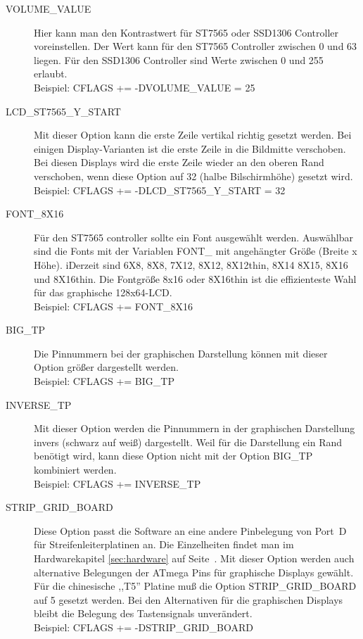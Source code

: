 \begin{description}
  \item[VOLUME\_VALUE] Hier kann man den Kontrastwert für ST7565 oder SSD1306 Controller voreinstellen.
Der Wert kann für den ST7565 Controller zwischen 0 und 63 liegen.
Für den SSD1306 Controller sind Werte zwischen 0 und 255 erlaubt.\\
Beispiel: CFLAGS += -DVOLUME\_VALUE = 25

  \item[LCD\_ST7565\_Y\_START] Mit dieser Option kann die erste Zeile vertikal richtig gesetzt werden.
Bei einigen Display-Varianten ist die erste Zeile in die Bildmitte verschoben.
Bei diesen Displays wird die erste Zeile wieder an den oberen Rand verschoben, 
wenn diese Option auf 32 (halbe Bilschirmhöhe) gesetzt wird.\\
Beispiel: CFLAGS += -DLCD\_ST7565\_Y\_START = 32

  \item[FONT\_8X16] Für den ST7565 controller sollte ein Font ausgewählt werden.
Auswählbar sind die Fonts mit der Variablen FONT\_ mit angehängter Größe (Breite x Höhe).
iDerzeit sind 6X8, 8X8, 7X12, 8X12, 8X12thin, 8X14 8X15, 8X16 und 8X16thin.
Die Fontgröße 8x16 oder 8X16thin ist die effizienteste Wahl für das graphische 128x64-LCD.\\
Beispiel: CFLAGS += FONT\_8X16

 \item[BIG\_TP] Die Pinnummern bei der graphischen Darstellung können mit dieser Option größer dargestellt werden.\\
Beispiel: CFLAGS += BIG\_TP

 \item[INVERSE\_TP] Mit dieser Option werden die Pinnummern in der graphischen Darstellung invers (schwarz auf weiß) dargestellt.
Weil für die Darstellung ein Rand benötigt wird, kann diese Option nicht mit der Option BIG\_TP kombiniert werden.\\
Beispiel: CFLAGS += INVERSE\_TP

  \item[STRIP\_GRID\_BOARD] Diese Option passt die Software an eine andere Pinbelegung von Port~D für Streifenleiterplatinen an.
Die Einzelheiten findet man im Hardwarekapitel \ref{sec:hardware} auf Seite~\pageref{sec:hardware}.
Mit dieser Option werden auch alternative Belegungen der ATmega Pins für graphische Displays gewählt.
Für die chinesische ,,T5'' Platine muß die Option STRIP\_GRID\_BOARD auf 5 gesetzt werden.
Bei den Alternativen für die graphischen Displays bleibt die Belegung  des Tastensignals unverändert.\\
Beispiel: CFLAGS += -DSTRIP\_GRID\_BOARD


\end{description}
